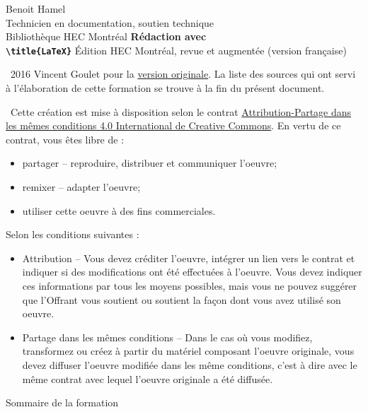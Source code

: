 \scriptsize

\begin{frame}
	Benoit Hamel \\
	Technicien en documentation, soutien technique \\
	Bibliothèque HEC Montréal
	\vfill
	{
		\Huge\bfseries
		Rédaction avec \\
		\texttt{\textbackslash title\{\textrm{\LaTeX}\}}
	}
	\vfill
	Édition HEC Montréal, revue et augmentée (version française)
\end{frame}

\begin{frame}
	\faCopyright\ 2016 Vincent Goulet pour la 
	\href{https://ctan.org/pkg/formation-latex-ul}{version originale}. La liste des sources qui ont 
	servi à l'élaboration de cette formation se trouve à la fin du présent document.
	
	\faCreativeCommons\ Cette création est mise à disposition selon le contrat 
	\href{http://creativecommons.org/licenses/by-sa/4.0/deed.fr}{%
	Attribution-Partage dans les mêmes conditions 4.0 International de Creative Commons}. 
	En vertu de ce contrat, vous êtes libre de :
	
	\begin{itemize}
		\item partager -- reproduire, distribuer et communiquer l’oeuvre;
		\item remixer -- adapter l’oeuvre;
		\item utiliser cette oeuvre à des fins commerciales.
	\end{itemize}

	Selon les conditions suivantes :
	
	\begin{itemize}
		\item Attribution -- Vous devez créditer l’oeuvre, intégrer un lien vers le contrat et indiquer si des modifications ont été effectuées à l’oeuvre. Vous devez indiquer ces informations par tous les moyens possibles, mais vous ne pouvez suggérer que l’Offrant vous soutient ou soutient la façon dont vous avez utilisé son oeuvre.
		\item Partage dans les mêmes conditions -- Dans le cas où vous modifiez, transformez ou créez à partir du matériel composant l’oeuvre
		originale, vous devez diffuser l’oeuvre modifiée dans les même conditions, c’est à dire avec le même contrat avec lequel l’oeuvre originale a été diffusée.
	\end{itemize}
\end{frame}

\begin{frame}{Sommaire de la formation}
	\begin{columns}[onlytextwidth]
		\begin{column}{.49\textwidth}
			\tableofcontents[sections={1-2}]
		\end{column}
		\begin{column}{.49\textwidth}
			\tableofcontents[sections={3}]
		\end{column}
	\end{columns}
\end{frame}